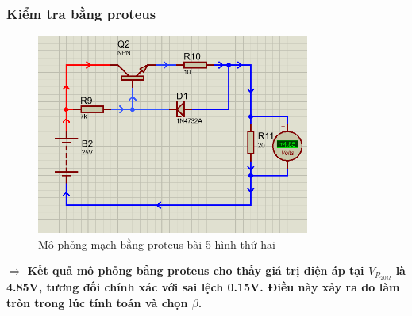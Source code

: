     \subsubsection{Kiểm tra bằng proteus}
    \begin{figure}[H]
        \centering
        \includegraphics[width=0.8\textwidth]{pictures/result5_b.png}
        \caption{Mô phỏng mạch bằng proteus bài 5 hình thứ hai}
    \end{figure}
    $\Rightarrow$ 
    \textbf{Kết quả mô phỏng bằng proteus cho thấy giá trị điện áp tại $V_{R_{20\Omega }}$ là 4.85V, tương đối chính xác với sai lệch 0.15V. Điều này xảy ra do làm tròn trong lúc tính toán và chọn $\beta$.}

